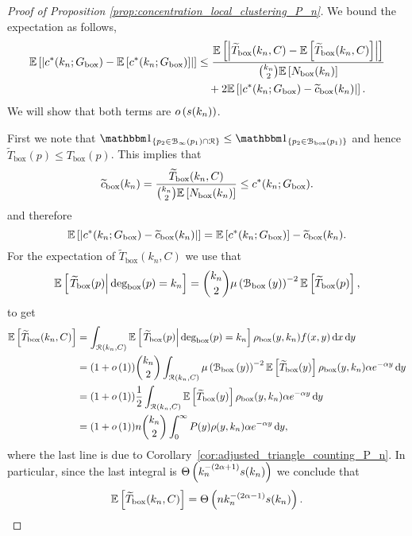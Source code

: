 \begin{proof}[Proof of Proposition \ref{prop:concentration_local_clustering_P_n}]
We bound the expectation as follows,
\begin{align*}
	\mathbb{E}\left[\left|c^\ast(k_n; G_{\text{box}}) - \mathbb{E}\left[c^\ast(k_n; G_{\text{box}})\right]\right|\right] 
	&\le \frac{\mathbb{E}\left[\left|\widetilde{T}_{\text{box}}(k_n,C) - \mathbb{E}\left[\widetilde{T}_{\text{box}}(k_n,C)\right]\right|\right]}
		{\binom{k_n}{2}\mathbb{E}\left[N_{\text{box}}(k_n)\right]}\\
	&\hspace{10pt} + 2 \mathbb{E}\left[\left|c^\ast(k_n; G_{\text{box}}) - \widetilde{c}_{\text{box}}(k_n)\right|\right].
\end{align*}
We will show that both terms are $o\left(s(k_n)\right)$.

First we note that $\ind{p_2 \in \BallPo{p_1} \cap \Rcal} \le \ind{p_2 \in \BallPon{p_1}}$ and hence $\widetilde{T}_{\text{box}}(p) \le T_{\text{box}}(p)$. This implies that
\[
	 \widetilde{c}_{\text{box}}(k_n) = \frac{\widetilde{T}_{\text{box}}(k_n,C)}{\binom{k_n}{2}\mathbb{E}\left[N_{\text{box}}(k_n)\right]} \le c^\ast(k_n; G_{\text{box}}). 
\]
and therefore
\[
	\mathbb{E}\left[\left|c^\ast(k_n; G_{\text{box}}) - \widetilde{c}_{\text{box}}(k_n)\right|\right]
	= \mathbb{E}\left[c^\ast(k_n; G_{\text{box}})\right] - \widetilde{c}_{\text{box}}(k_n).
\]
For the expectation of $\widetilde{T}_{\text{box}}(k_n,C)$ we use that 
\[
	\mathbb{E}\left[\left.\widetilde{T}_{\text{box}}(p)\right|\text{deg}_{\text{box}}(p) = k_n\right]
= \binom{k_n}{2} \mu\left({\mathcal B}_{\text{box}}\left(y\right)\right)^{-2} \mathbb{E}\left[\widetilde{T}_{\text{box}}(p)\right],
\] 
to get
\begin{align*}
	\mathbb{E}\left[\widetilde{T}_{\text{box}}(k_n,C)\right] 
	&= \int_{{\mathcal R}(k_n,C)} \mathbb{E}\left[\left.\widetilde{T}_{\text{box}}(p)\right|\text{deg}_{\text{box}}(p) = k_n\right]
		\rho_{\text{box}}(y,k_n) f(x,y) \operatorname{\mathrm{d}\hspace{-2pt}} x \operatorname{\mathrm{d}\hspace{-2pt}} y\\
	&= (1+o\left(1\right)) \binom{k_n}{2} \int_{{\mathcal R}(k_n,C)} \mu\left({\mathcal B}_{\text{box}}\left(y\right)\right)^{-2} \mathbb{E}\left[\widetilde{T}_{\text{box}}(y)\right]
		\rho_{\text{box}}(y,k_n) \alpha e^{-\alpha y} \operatorname{\mathrm{d}\hspace{-2pt}} y\\
	&= (1+o\left(1\right)) \frac{1}{2} \int_{{\mathcal R}(k_n,C)} \mathbb{E}\left[\widetilde{T}_{\text{box}}(y)\right]
			\rho_{\text{box}}(y,k_n) \alpha e^{-\alpha y} \operatorname{\mathrm{d}\hspace{-2pt}} y\\
	&= (1+o\left(1\right)) n \binom{k_n}{2} \int_0^\infty P(y) \rho(y,k_n) \alpha e^{-\alpha y} \operatorname{\mathrm{d}\hspace{-2pt}} y,
\end{align*}
where the last line is due to Corollary~\ref{cor:adjusted_triangle_counting_P_n}. In particular, since the last integral is $\Theta\left(k_n^{-(2\alpha + 1)} s(k_n)\right)$ we conclude that
\begin{equation}\label{eq:scaling_exected_tilde_T}
	\mathbb{E}\left[\widetilde{T}_{\text{box}}(k_n,C)\right] = \Theta\left(n k_n^{-(2\alpha - 1)}s(k_n)\right). 
\end{equation}


\end{proof}

